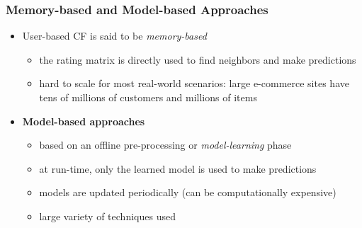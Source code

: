 \documentclass{beamer}
\begin{document}

\begin{frame}
    \frametitle{Memory-based and Model-based Approaches}
    \begin{itemize}
    \item User-based CF is said to be \emph{memory-based}
        \begin{itemize}
        \item the rating matrix is directly used to find neighbors and make
            predictions
        \item hard to scale for most real-world scenarios: large e-commerce
            sites have tens of millions of customers and millions of items
        \end{itemize}
    \item \textbf{Model-based approaches}
        \begin{itemize}
        \item based on an offline pre-processing or \emph{model-learning} phase
        \item at run-time, only the learned model is used to make predictions
        \item models are updated periodically (can be computationally
            expensive)
        \item large variety of techniques used
        \end{itemize}
    \end{itemize}
\end{frame}
\end{document}
